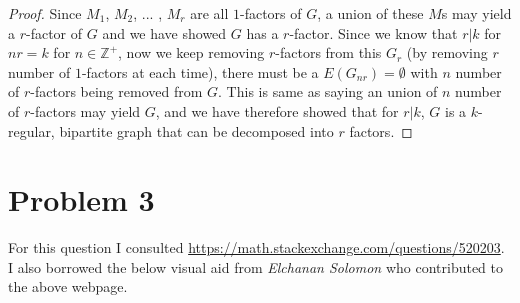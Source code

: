 \documentclass[11pt]{article}
\begin{document}
\begin{proof}
Since $M_1$, $M_2$, ... , $M_r$ are all $1$-factors of $G$, a union of these $M$s may yield a $r$-factor of $G$ and we have showed $G$ has a $r$-factor. Since we know that $r | k$ for $nr = k$ for $n \in \mathbb{Z}^+$, now we keep removing $r$-factors from this $G_r$ (by removing $r$ number of $1$-factors at each time), there must be a $E(G_{nr}) = \emptyset$ with $n$ number of $r$-factors being removed from $G$. This is same as saying an union of $n$ number of $r$-factors may yield $G$, and we have therefore showed that for $r | k$, $G$ is a $k$-regular, bipartite graph that can be decomposed into $r$ factors.

\end{proof}






\section{Problem 3}


For this question I consulted \url{https://math.stackexchange.com/questions/520203}. I also borrowed the below visual aid from \textit{Elchanan Solomon} who contributed to the above webpage.
\end{document}
